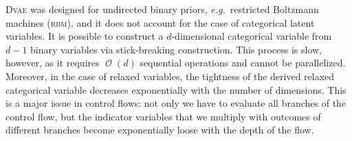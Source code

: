 \textsc{Dvae} was designed for undirected binary priors, \textit{e.g.}\ restricted Boltzmann machines (\textsc{rbm}), and it does not account for the case of categorical latent variables.
It is possible to construct a $d$-dimensional categorical variable from  $d-1$ binary variables via stick-breaking construction.
This process is slow, however, as it requires $\operatorname{\mathcal{O}}(d)$ sequential operations and cannot be parallelized.
Moreover, in the case of relaxed variables, the tightness of the derived relaxed categorical variable decreases exponentially with the number of dimensions.
This is a major issue in control flows: not only we have to evaluate all branches of the control flow, but the indicator variables that we multiply with outcomes of different branches become exponentially loose with the depth of the flow.



